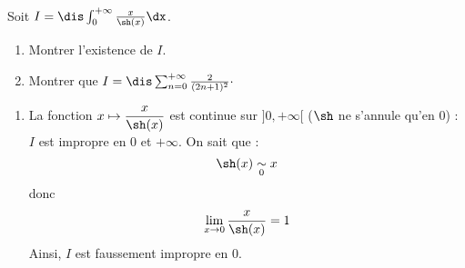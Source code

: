 \documentclass[a4paper,10pt]{report}
\begin{document}
\begin{Exercice}{}\label{gamma} Soit $I = \dis \int_{0}^{+ \infty} \frac{x}{\sh(x)} \dx$.

\begin{enumerate}
\item Montrer l'existence de $I$.
\item Montrer que $I= \dis \sum_{n=0}^{+ \infty} \frac{2}{(2n+1)^2}\cdot$
\end{enumerate}
\end{Exercice} 

\corr 

\begin{enumerate}
\item La fonction $x \mapsto \dfrac{x}{\sh(x)}$ est continue sur $]0, + \infty[$ ($\sh$ ne s'annule qu'en $0$) : $I$ est impropre en $0$ et $+ \infty$. On sait que :
$$ \sh(x) \underset{0}{\sim} x$$
donc 
$$ \lim_{x \rightarrow 0} \dfrac{x}{\sh(x)} = 1$$
Ainsi, $I$ est faussement impropre en $0$. 

\medskip


\end{enumerate}
\end{document}
